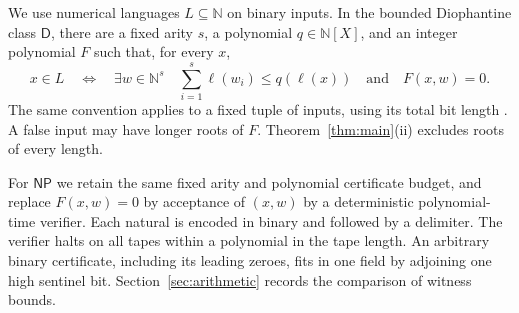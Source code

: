\documentclass[11pt,letterpaper]{article}
\numberwithin{equation}{section}
\newcommand{\DD}{\mathsf D}
\newcommand{\NP}{\mathsf{NP}}
\begin{document}
We use numerical languages $L\subseteq\mathbb N$ on binary inputs. In the bounded Diophantine class $\DD$, there are a fixed arity $s$, a polynomial $q\in\mathbb N[X]$, and an integer polynomial $F$ such that, for every $x$,
\[
 x\in L \quad\Longleftrightarrow\quad
 \exists w\in\mathbb N^s\quad
 \sum_{i=1}^s\ell(w_i)\le q(\ell(x))\quad\text{and}\quad F(x,w)=0 .
\]
The same convention applies to a fixed tuple of inputs, using its total bit length \cite{am,pollett,lipmaa}. A false input may have longer roots of $F$. Theorem~\ref{thm:main}(ii) excludes roots of every length.

For $\NP$ we retain the same fixed arity and polynomial certificate budget, and replace $F(x,w)=0$ by acceptance of $(x,w)$ by a deterministic polynomial-time verifier. Each natural is encoded in binary and followed by a delimiter. The verifier halts on all tapes within a polynomial in the tape length. An arbitrary binary certificate, including its leading zeroes, fits in one field by adjoining one high sentinel bit. Section~\ref{sec:arithmetic} records the comparison of witness bounds.
\end{document}
